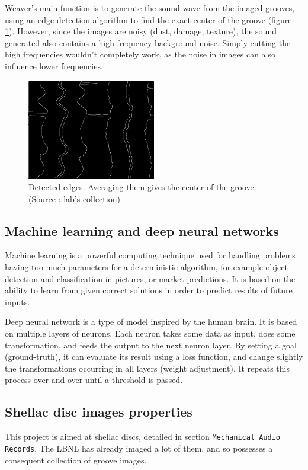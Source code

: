 \documentclass[12pt, twoside]{article}
\begin{document}
Weaver's main function is to generate the sound wave from the imaged grooves, using an edge detection algorithm to find the exact center of the groove (figure \ref{edges}). However, since the images are noisy (dust, damage, texture), the sound generated also contains a high frequency background noise. Simply cutting the high frequencies wouldn't completely work, as the noise in images can also influence lower frequencies.

\begin{figure}[H]
	\centering
	\includegraphics[width=0.5\textwidth]{../images/edges.png}
	\caption{Detected edges. Averaging them gives the center of the groove. (Source : lab's collection)}
	\label{edges}
\end{figure}
\subsection{Machine learning and deep neural networks}
Machine learning is a powerful computing technique used for handling problems having too much parameters for a deterministic algorithm, for example object detection and classification in pictures, or market predictions. It is based on the ability to learn from given correct solutions in order to predict results of future inputs.

Deep neural network is a type of model inspired by the human brain. It is based on multiple layers of neurons. Each neuron takes some data as input, does some transformation, and feeds the output to the next neuron layer. By setting a goal (ground-truth), it can evaluate its result using a loss function, and change slightly the transformations occurring in all layers (weight adjustment). It repeats this process over and over until a threshold is passed.
\subsection{Shellac disc images properties}
This project is aimed at shellac discs, detailed in section \texttt{Mechanical Audio Records}. The LBNL has already imaged a lot of them, and so possesses a consequent collection of groove images.
\end{document}
